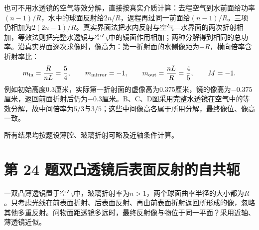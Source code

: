 \documentclass[UTF8,fontset=fandol,a4paper,11pt]{ctexart}
\begin{document}
也可不用水透镜的空气等效分解，直接按真实介质计算：去程空气到水前面给功率$(n-1)/R$，水中的球面反射给$2n/R$，返程再过同一前面给$(n-1)/R$。三项仍相加为$2(2n-1)/R$。真实界面法把水内反射与空气—水界面的两次折射相加，等效法则把完整水透镜与空气中的镜面作用相加；两种分解得到相同的总功率。沿真实界面逐次求像时，像高为：第一折射面的水侧像距为$-R$，横向倍率含折射率比：
\[
m_{\rm in}=\frac{R}{nL}=\frac54,\qquad
m_{\rm mirror}=-1,\qquad
m_{\rm out}=\frac{nL}{R}=\frac45,
\qquad M=-1.
\]
例如初始高度0.3厘米，实际第一折射面的虚像高为0.375厘米，镜的像高为$-0.375$厘米，返回前面折射后仍为$-0.3$厘米。B、C、D图采用完整水透镜在空气中的等效分解，故中间倍率为$5/3$与$3/5$；这些中间像高各属于所用分解，最终像位、像高一致。

所有结果均按题设薄腔、玻璃折射可略及近轴条件计算。




\section*{第 24 题\quad 双凸透镜后表面反射的自共轭}\label{q:24}

一双凸薄透镜置于空气中，玻璃折射率为$n>1$，两个球面曲率半径的大小都为$R$。只考虑光线在前表面折射、后表面反射、再由前表面折射返回所形成的像，忽略其他多重反射。问物面距透镜多远时，最终反射像与物位于同一平面？采用近轴、薄透镜近似。
\end{document}

